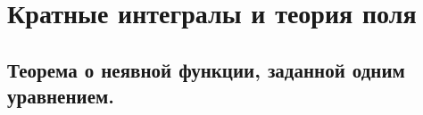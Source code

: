 \newpage
\section{Кратные интегралы и теория поля}
\subsection{Теорема о неявной функции, заданной одним уравнением.}